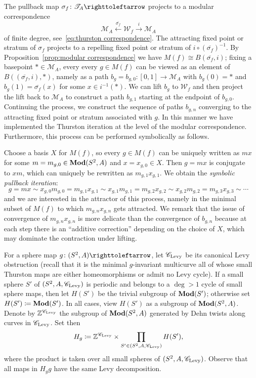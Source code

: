 \documentclass{amsart}
\begin{document}
The pullback map $\sigma_f\colon \mathscr T_A\selfmap$ projects to a
modular correspondence
\[
\mathscr M_A
\overset{\overline{\sigma_f}}\longleftarrow
\mathscr W_f \overset i\longrightarrow  \mathscr M_A
\]
of finite degree, see~\eqref{eq:thurston correspondence}. The
attracting fixed point or stratum of $\sigma_f$ projects to a
repelling fixed point or stratum of
$i\circ (\overline{\sigma_f})^{-1}$. By Proposition~\ref{prop:modular
  correspondence} we have $M(f)\cong B(\overline{\sigma_f},i)$; fixing
a basepoint $*\in\mathscr M_A$, every every $g\in M(f)$ can be viewed
as an element of $B((\overline{\sigma_f},i),*)$, namely as a path
$b_g=b_{g,0}\colon [0,1]\to \mathscr M_A$ with $b_g(0)=*$ and
$b_g(1)=\overline{\sigma_f}(x)$ for some $x\in i^{-1}(*)$. We can lift
$b_g$ to $\mathscr W_f$ and then project the lift back to
$\mathscr M_A$ to construct a path $b_{g,1}$ starting at the endpoint
of $b_{g,0}$. Continuing the process, we construct the sequence of
paths $b_{g,n}$ converging to the attracting fixed point or stratum
associated with $g$. In this manner we have implemented the Thurston
iteration at the level of the modular correspondence. Furthermore,
this process can be performed symbolically as follows.

Choose a basis $X$ for $M(f)$, so every $g\in M(f)$ can be uniquely
written as $m x$ for some $m=m_{g,0}\in \mathbf{\relax Mod}(S^2,A)$ and
$x=x_{g,0}\in X$. Then $g=m x$ is conjugate to $x m$, which can
uniquely be rewritten as $m_{g,1} x_{g,1}$. We obtain the
\emph{symbolic pullback iteration}:
\begin{equation}\label{eq:SymbIterat}
  g=m x \sim x_{g,0}m_{g,0} = m_{g,1}x_{g,1}\sim x_{g,1}m_{g,1} = m_{g,2}x_{g,2}\sim x_{g,2}m_{g,2} = m_{g,3} x_{g,3}\sim\cdots
\end{equation}
and we are interested in the attractor of this process, namely in the
minimal subset of $M(f)$ to which $m_{g,n}x_{g,n}$ gets attracted. We
remark that the issue of convergence of $m_{g,n}x_{g,n}$ is more
delicate than the convergence of $b_{g,n}$ because at each step there
is an ``additive correction'' depending on the choice of $X$, which
may dominate the contraction under lifting.

For a sphere map $g\colon (S^2,A)\selfmap$, let ${\mathscr C}_{\text{Levy}}$
be its canonical Levy obstruction (recall that it is the minimal
$g$-invariant multicurve all of whose small Thurston maps are either
homeomorphisms or admit no Levy cycle). If a small sphere $S'$ of
$(S^2,A,{\mathscr C}_{\text{Levy}})$ is periodic and belongs to a $\deg >1$
cycle of small sphere maps, then let $H(S')$ be the trivial subgroup
of $\mathbf{\relax Mod}(S')$; otherwise set $H(S')\coloneqq \mathbf{\relax Mod}(S')$. In all cases,
view $H(S')$ as a subgroup of $\mathbf{\relax Mod}(S^2,A)$. Denote by
${\mathbb Z}^{{\mathscr C}_{\text{Levy}}}$ the subgroup of $\mathbf{\relax Mod}(S^2,A)$ generated by
Dehn twists along curves in ${\mathscr C}_{\text{Levy}}$. Set then
\[H_g\coloneqq {\mathbb Z}^{{\mathscr C}_{\text{Levy}}} \times \prod_{S'\in (S^2,A,{\mathscr C}_{\text{Levy}})} H(S'),
\]
where the product is taken over all small spheres of
$(S^2,A,{\mathscr C}_{\text{Levy}})$. Observe that all maps in $H_g g$ have
the same Levy decomposition.
\end{document}
